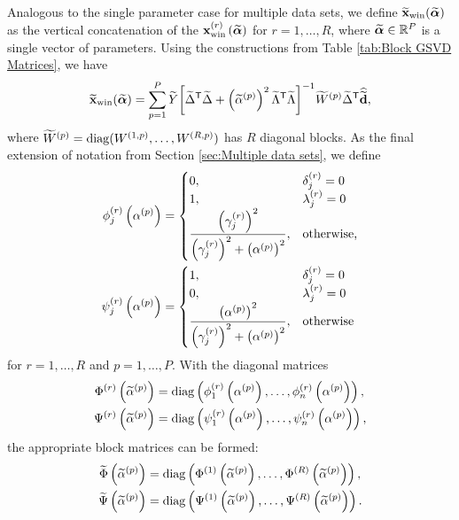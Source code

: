 \documentclass[12pt]{article}
\begin{document}
Analogous to the single parameter case for multiple data sets, we define $\widetilde{\mathbf{x}}_{\text{win}}(\widetilde{\bm{\alpha}})$ as the vertical concatenation of the $\mathbf{x}_{\text{win}}^{(r)}\left(\widetilde{\bm{\alpha}}\right)$ for $r = 1,\ldots,R$, where $\widetilde{\bm{\alpha}} \in \mathbb{R}^P$ is a single vector of parameters. Using the constructions from Table \ref{tab:Block GSVD Matrices}, we have
\begin{equation}
\label{eq:Big Windowed Solution}
    \widetilde{\mathbf{x}}_{\text{win}}(\widetilde{\bm{\alpha}}) = \sum_{p=1}^{P} \widetilde{Y}{\left[{\widetilde{\Delta}}^\mathsf{T}\widetilde{\Delta} + \left(\widetilde{\alpha}^{(p)}\right)^2 {\widetilde{\Lambda}}^\mathsf{T}\widetilde{\Lambda}\right]}^{-1}\widetilde{W}^{(p)}{\widetilde{\Delta}}^\mathsf{T}\widehat{\widetilde{\mathbf{d}}},
\end{equation}
where $\widetilde{W}^{(p)} = \operatorname{diag}(W^{(1,p)},\ldots,W^{(R,p)})$ has $R$ diagonal blocks. As the final extension of notation from Section \ref{sec:Multiple data sets}, we define
\begin{align}
    \phi_j^{(r)}\left(\alpha^{(p)}\right) &= \begin{cases}
0, & \delta_j^{(r)} = 0 \\
1, & \lambda_j^{(r)} = 0 \\
\dfrac{\left(\gamma_j^{(r)}\right)^2}{\left(\gamma_j^{(r)}\right)^2 + \left(\alpha^{(p)}\right)^2}, & \text{otherwise,}
\end{cases} \nonumber \\
\psi_j^{(r)}\left(\alpha^{(p)}\right) &= \begin{cases}
1, & \delta_j^{(r)} = 0 \\
0, & \lambda_j^{(r)} = 0 \\
\dfrac{\left(\alpha^{(p)}\right)^2}{\left(\gamma_j^{(r)}\right)^2 + \left(\alpha^{(p)}\right)^2}, & \text{otherwise}
\end{cases}
\label{eq:Redefinition of Filter}
\end{align}
for $r = 1,\ldots,R$ and $p = 1,\ldots,P$. With the diagonal matrices
\begin{align*}
    \Phi^{(r)}\left(\widetilde{\alpha}^{(p)}\right) &= \operatorname{diag}\left(\phi_1^{(r)}\left(\alpha^{(p)}\right),\ldots,\phi_n^{(r)}\left(\alpha^{(p)}\right)\right), \\ \Psi^{(r)}\left(\widetilde{\alpha}^{(p)}\right) &= \operatorname{diag}\left(\psi_1^{(r)}\left(\alpha^{(p)}\right),\ldots,\psi_n^{(r)}\left(\alpha^{(p)}\right)\right),
\end{align*}
the appropriate block matrices can be formed:
\begin{align*}
    \widetilde{\Phi}\left(\widetilde{\alpha}^{(p)}\right) &= \operatorname{diag}\left(\Phi^{(1)}\left(\widetilde{\alpha}^{(p)}\right),\ldots,\Phi^{(R)}\left(\widetilde{\alpha}^{(p)}\right)\right), \\ \widetilde{\Psi}\left(\widetilde{\alpha}^{(p)}\right) &= \operatorname{diag}\left(\Psi^{(1)}\left(\widetilde{\alpha}^{(p)}\right),\ldots,\Psi^{(R)}\left(\widetilde{\alpha}^{(p)}\right)\right).
\end{align*}
\end{document}

